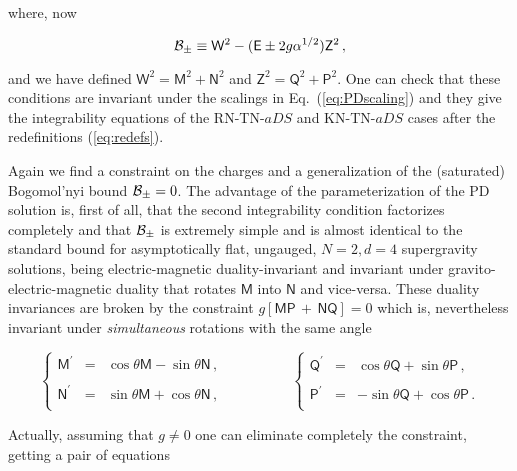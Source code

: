 \documentclass[12pt,a4paper]{article}
\begin{document}
\noindent where, now

\begin{equation}
{\cal B}_{\pm} \equiv \mathsf{W}^{2}
-(\mathsf{E}\pm 2g\alpha^{1/2})\mathsf{Z}^{2}\, ,
\end{equation}

\noindent and we have defined $\mathsf{W}^{2}
=\mathsf{M}^{2}+\mathsf{N}^{2}$ and $\mathsf{Z}^{2}=
\mathsf{Q}^{2}+\mathsf{P}^{2}$.  One can check that these conditions
are invariant under the scalings in Eq.~(\ref{eq:PDscaling}) and they
give the integrability equations of the RN-TN-$aDS$ and KN-TN-$aDS$
cases after the redefinitions (\ref{eq:redefs}).

Again we find a constraint on the charges and a generalization of the
(saturated) Bogomol'nyi bound ${\cal B}_{\pm}=0$. The advantage of the
parameterization of the PD solution is, first of all, that the second
integrability condition factorizes completely and that ${\cal
  B}_{\pm}$ is extremely simple and is almost identical to the
standard bound for asymptotically flat, ungauged, $N=2,d=4$
supergravity solutions, being electric-magnetic duality-invariant and
invariant under gravito-electric-magnetic duality that rotates
$\mathsf{M}$ into $\mathsf{N}$ and vice-versa. These duality
invariances are broken by the constraint $g\left[
  \mathsf{M}\mathsf{P}\,+\,\mathsf{N}\mathsf{Q}\right] =0$ which is,
nevertheless invariant under {\it simultaneous} rotations with the
same angle

\begin{equation}
\left\{
\begin{array}{rcl}
\mathsf{M}^{\prime} & = & \cos{\theta}\mathsf{M} -\sin{\theta}\mathsf{N}\, ,\\
& & \\
\mathsf{N}^{\prime} & = & \sin{\theta}\mathsf{M} +\cos{\theta}\mathsf{N}\, ,\\
\end{array}
\right.
\hspace{2cm}
\left\{
\begin{array}{rcl}
\mathsf{Q}^{\prime} & = & \cos{\theta}\mathsf{Q} +\sin{\theta}\mathsf{P}\, ,\\
& & \\
\mathsf{P}^{\prime} & = & -\sin{\theta}\mathsf{Q}+\cos{\theta}\mathsf{P}\, .\\
\end{array}
\right.
\end{equation}

Actually, assuming that $g\neq 0$ one can eliminate completely the
constraint, getting a pair of equations
\end{document}
